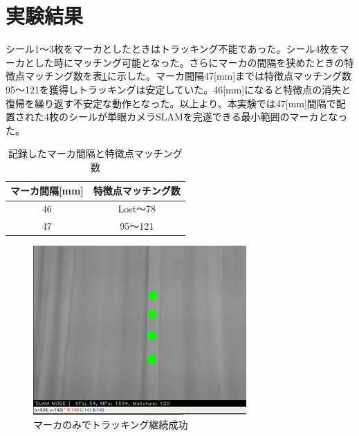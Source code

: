 \newpage

\section{実験結果}

シール1〜3枚をマーカとしたときはトラッキング不能であった。シール4枚をマーカとした時にマッチング可能となった。さらにマーカの間隔を狭めたときの特徴点マッチング数を表\ref{table:matching value}に示した。マーカ間隔47[mm]までは特徴点マッチング数95〜121を獲得しトラッキングは安定していた。46[mm]になると特徴点の消失と復帰を繰り返す不安定な動作となった。以上より、本実験では47[mm]間隔で配置された4枚のシールが単眼カメラSLAMを完遂できる最小範囲のマーカとなった。

\begin{table}[htb]
\begin{center}
  \caption{記録したマーカ間隔と特徴点マッチング数}
  \label{table:matching value}
  \begin{tabular}{|c||c|} \hline
	マーカ間隔[mm] & 特徴点マッチング数 \\ \hline \hline
	46 & Lost〜78 \\ \hline
	47 & 95〜121 \\ \hline
  \end{tabular}
\end{center}
\end{table}

\begin{figure}[h]
        \begin{center}
        \includegraphics[width=0.7\linewidth]{figs/Tracking03.jpg}
        \caption{マーカのみでトラッキング継続成功}
        \label{fig:Tracking03}
        \end{center}
\end{figure}

